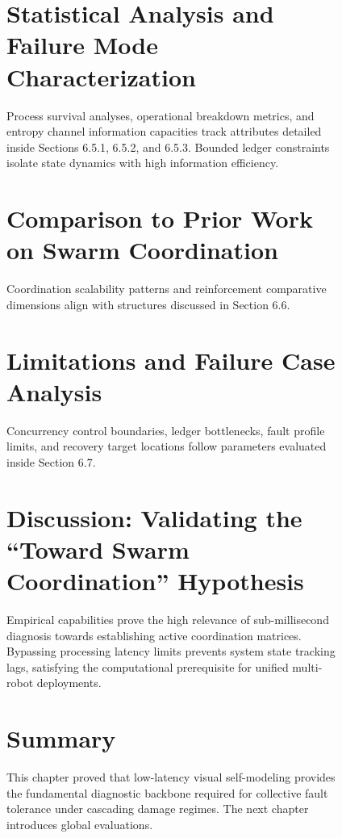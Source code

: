 \documentclass[12pt,a4paper,oneside]{report}
\begin{document}
\begin{figure}[H]
\section{Statistical Analysis and Failure Mode Characterization}

Process survival analyses, operational breakdown metrics, and entropy channel information capacities track attributes detailed inside Sections 6.5.1, 6.5.2, and 6.5.3. Bounded ledger constraints isolate state dynamics with high information efficiency.

\section{Comparison to Prior Work on Swarm Coordination}

Coordination scalability patterns and reinforcement comparative dimensions align with structures discussed in Section 6.6.

\section{Limitations and Failure Case Analysis}

Concurrency control boundaries, ledger bottlenecks, fault profile limits, and recovery target locations follow parameters evaluated inside Section 6.7.

\section{Discussion: Validating the ``Toward Swarm Coordination'' Hypothesis}

Empirical capabilities prove the high relevance of sub-millisecond diagnosis towards establishing active coordination matrices. Bypassing processing latency limits prevents system state tracking lags, satisfying the computational prerequisite for unified multi-robot deployments.

\section{Summary}

This chapter proved that low-latency visual self-modeling provides the fundamental diagnostic backbone required for collective fault tolerance under cascading damage regimes. The next chapter introduces global evaluations.
\clearpage


\end{figure}
\end{document}
